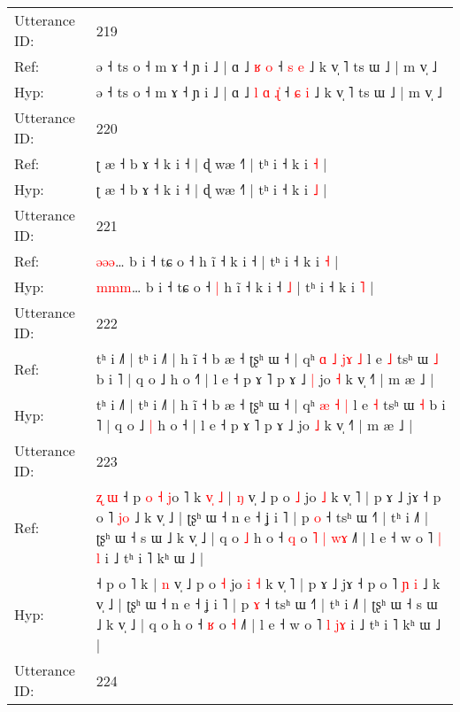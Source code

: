\documentclass[10pt]{article}
\DeclareRobustCommand{\hl}[1]{{\textcolor{red}{#1}}}
\begin{document}
\begin{longtable}{ll}
 \\
\midrule
Utterance ID: & 219 \\
Ref: & ə ˧ ts o ˧ m ɤ ˧ ɲ i ˩ | ɑ ˩\hl{}\hl{} \hl{ʁ} \hl{}\hl{o} ˧ \hl{s} \hl{e} ˩ k v̩ ˥ ts ɯ ˩ | m v̩ ˩
 \\
Hyp: & ə ˧ ts o ˧ m ɤ ˧ ɲ i ˩ | ɑ ˩\hl{ }\hl{l} \hl{ɑ} \hl{ɻ}\hl{̍} ˧ \hl{ɕ} \hl{i} ˩ k v̩ ˥ ts ɯ ˩ | m v̩ ˩
 \\
\midrule
Utterance ID: & 220 \\
Ref: & ʈ æ ˧ b ɤ ˧ k i ˧ | ɖ wæ ˧˥ | tʰ i ˧ k i \hl{˧} |
 \\
Hyp: & ʈ æ ˧ b ɤ ˧ k i ˧ | ɖ wæ ˧˥ | tʰ i ˧ k i \hl{˩} |
 \\
\midrule
Utterance ID: & 221 \\
Ref: & \hl{ə}\hl{ə}\hl{ə}… b i ˧ tɕ o ˧\hl{}\hl{} h ĩ ˧ k i ˧\hl{}\hl{} | tʰ i ˧ k i \hl{˧} |
 \\
Hyp: & \hl{m}\hl{m}\hl{m}… b i ˧ tɕ o ˧\hl{ }\hl{|} h ĩ ˧ k i ˧\hl{ }\hl{˩} | tʰ i ˧ k i \hl{˥} |
 \\
\midrule
Utterance ID: & 222 \\
Ref: & tʰ i ˩˥ | tʰ i ˩˥ | h ĩ ˧ b æ ˧ ʈʂʰ ɯ ˧ | qʰ\hl{ }\hl{ɑ} \hl{˩} \hl{j}\hl{ɤ} \hl{˩} l e \hl{˩} tsʰ ɯ \hl{˩} b i ˥ | q o ˩\hl{}\hl{} h o ˧\hl{˥} | l e ˧ p ɤ ˥ p ɤ ˩\hl{ }\hl{|} jo \hl{˧} k v̩ ˧˥ | m æ ˩ |
 \\
Hyp: & tʰ i ˩˥ | tʰ i ˩˥ | h ĩ ˧ b æ ˧ ʈʂʰ ɯ ˧ | qʰ\hl{}\hl{} \hl{æ} \hl{}\hl{˧} \hl{|} l e \hl{˧} tsʰ ɯ \hl{˧} b i ˥ | q o ˩\hl{ }\hl{|} h o ˧\hl{} | l e ˧ p ɤ ˥ p ɤ ˩\hl{}\hl{} jo \hl{˩} k v̩ ˧˥ | m æ ˩ |
 \\
\midrule
Utterance ID: & 223 \\
Ref: & \hl{ʐ}\hl{ }\hl{ɯ}\hl{ }˧ p\hl{ }\hl{o}\hl{ }\hl{˧} \hl{j}o ˥ k\hl{ }\hl{v}\hl{̩}\hl{ }\hl{˩} | \hl{ŋ} v̩ ˩ p o \hl{˩} jo\hl{}\hl{} \hl{˩} k v̩ ˥ | p ɤ ˩ jɤ ˧ p o ˥ \hl{}\hl{j}\hl{o} ˩ k v̩ ˩ | ʈʂʰ ɯ ˧ n e ˧ ʝ i ˥ | p \hl{o} ˧ tsʰ ɯ ˧˥ | tʰ i ˩˥ | ʈʂʰ ɯ ˧ s ɯ ˩ k v̩ ˩ | q o\hl{ }\hl{˩} h o ˧ \hl{q} o\hl{ }\hl{˥}\hl{ }\hl{|} \hl{w}\hl{ɤ} ˩˥ | l e ˧ w o ˥ \hl{|} \hl{}\hl{l} i ˩ tʰ i ˥ kʰ ɯ ˩ |
 \\
Hyp: & \hl{}\hl{}\hl{}\hl{}˧ p\hl{}\hl{}\hl{}\hl{} \hl{}o ˥ k\hl{}\hl{}\hl{}\hl{}\hl{} | \hl{n} v̩ ˩ p o \hl{˧} jo\hl{ }\hl{i} \hl{˧} k v̩ ˥ | p ɤ ˩ jɤ ˧ p o ˥ \hl{ɲ}\hl{ }\hl{i} ˩ k v̩ ˩ | ʈʂʰ ɯ ˧ n e ˧ ʝ i ˥ | p \hl{ɤ} ˧ tsʰ ɯ ˧˥ | tʰ i ˩˥ | ʈʂʰ ɯ ˧ s ɯ ˩ k v̩ ˩ | q o\hl{}\hl{} h o ˧ \hl{ʁ} o\hl{}\hl{}\hl{}\hl{} \hl{}\hl{˧} ˩˥ | l e ˧ w o ˥ \hl{l} \hl{j}\hl{ɤ} i ˩ tʰ i ˥ kʰ ɯ ˩ |
 \\
\midrule
Utterance ID: & 224 \\

\end{longtable}
\end{document}
